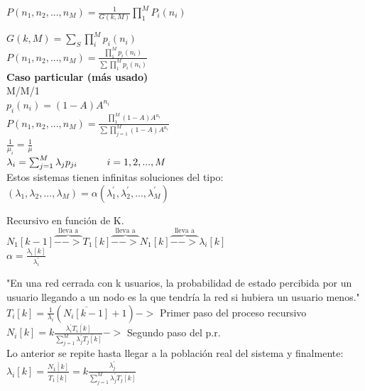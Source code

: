 \begin{minipage}{.22\textwidth}
	$P(n_1,n_2,...,n_M)=\frac{1}{G(k,M)}\prod_1^M{P_i(n_i)}$ \\
\end{minipage}
\vfill\null
\columnbreak
\begin{minipage}{.22\textwidth}	
	$G(k,M)=\sum_S{\prod_i^M{p_i(n_i)}}$ \\
	$P(n_1,n_2,...,n_M)=\frac{\prod_1^M{p_i(n_i)}}{\sum{\prod_1^M{p_i(n_i)}}}$ \\
	{\bf Caso particular (más usado)} \\
	M/M/1 \\
	$p_i{(n_i)}=(1-A)A^{n_i}$ \\
	$P(n_1,n_2,...,n_M)=\frac{\prod_1^M{(1-A)A^{n_i}}}{\sum{\prod_{j=1}^M{{(1-A)A^{n_i}}}}}$ \\
	$\frac{1}{\mu_i}=\frac{1}{\mu}$ \\
	$\lambda_i=\sum_{j=1}^M{\lambda_j{p_{ji}}} \hskip 3em i=1,2,...,M$ \\
	Estos sistemas tienen infinitas soluciones del tipo: \\
	$(\lambda_1,\lambda_2,...,\lambda_M)=\alpha(\lambda_1^{'},\lambda_2^{'},...,\lambda_M^{'})$
\end{minipage}

\begin{minipage}{.22\textwidth}
	Recursivo en función de K.\\
	$N_1[k-1]\overbrace{-->}^{\text{lleva a}}T_ 1[k]\overbrace{-->}^{\text{lleva a}}N_1[k]\overbrace{-->}^{\text{lleva a}}\lambda_i[k]$ \\
	$\alpha=\frac{\lambda_i[k]}{\lambda_i^{'}}$ \\
\end{minipage}

\begin{minipage}{.22\textwidth}
	"En una red cerrada con k usuarios, la probabilidad de estado percibida por un usuario llegando a un nodo es la que tendría la red si hubiera un usuario menos." \\
	$T_i[k]=\frac{1}{\lambda_i}(\overline{N_i[k-1]} + 1) ->$ Primer paso del proceso recursivo \\
	$N_i[k]=k\frac{\lambda_i^{'}{\overline{T_i[k]}}}{\sum_{j=1}^{M}{\lambda_j^{'}{\overline{T_j[k]}}}} ->$ Segundo paso del p.r. \\
	Lo anterior se repite hasta llegar a la población real del sistema y finalmente: \\
	$\lambda_i[k]=\frac{\overline{N_1[k]}}{\overline{T_1[k]}} = k\frac{\lambda_j^{'}}{\sum_{j=1}^{M}{\lambda_j^{'}{\overline{T_j[k]}}}}$ \\
\end{minipage}

